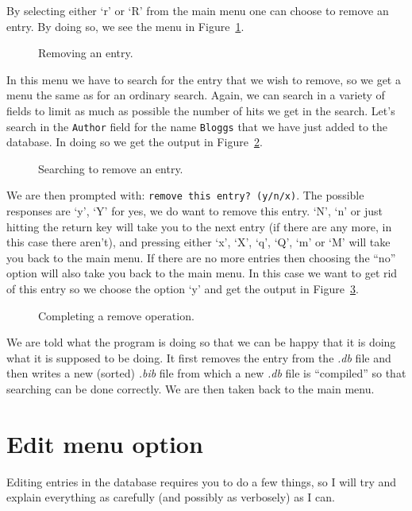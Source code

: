 \documentclass[12pt,a4paper]{book}
\newcommand {\fig}[1] {Figure~\ref{#1}}
\begin{document}
By selecting either `r' or `R' from the main menu one can choose to 
remove an entry.  By doing so, we see the menu in \fig{fig:remove}.
\begin{figure}[!ht]
\centerline{}
\caption{Removing an entry.}
\label{fig:remove}
\end{figure}
In this menu we have to search for the entry that we wish to remove, 
so we get a menu the same as for an ordinary search.  Again, we can 
search in a variety of fields to limit as much as possible the number 
of hits we get in the search.  Let's search in the {\tt Author} field 
for the name {\tt Bloggs} that we have just added to the database.  In 
doing so we get the output in \fig{fig:searchToRemove}.
\begin{figure}[!ht]
\centerline{}
\caption{Searching to remove an entry.}
\label{fig:searchToRemove}
\end{figure}
We are then prompted with: {\tt remove this entry? (y/n/x)}.  The 
possible responses are `y', `Y' for yes, we do want to remove this 
entry.  `N', `n' or just hitting the return key will take you to the 
next entry (if there are any more, in this case there aren't), and 
pressing either `x', `X', `q', `Q', `m' or `M' will take you back to 
the main menu.  If there are no more entries then choosing the ``no'' 
option will also take you back to the main menu.  In this case we 
want to get rid of this entry so we choose the option `y' and get the 
output in \fig{fig:removeFinish}.
\begin{figure}[!ht]
\centerline{}
\caption{Completing a remove operation.}
\label{fig:removeFinish}
\end{figure}
We are told what the program is doing so that we can be happy that it 
is doing what it is supposed to be doing.  It first removes the entry 
from the \emph{.db} file and then writes a new (sorted) \emph{.bib} 
file from which a new \emph{.db} file is ``compiled'' so that 
searching can be done correctly.  We are then taken back to the main 
menu.

\section{Edit menu option}

Editing entries in the database requires you to do a few things, so I 
will try and explain everything as carefully (and possibly as 
verbosely) as I can. 
\end{document}
